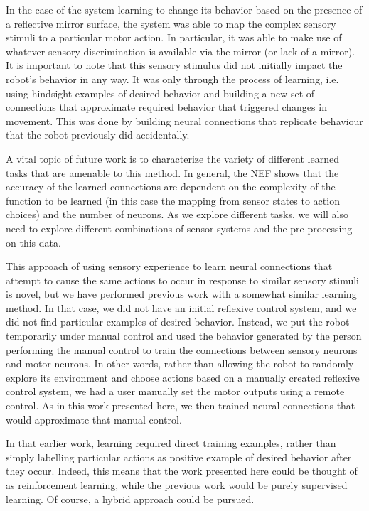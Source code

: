 \documentclass[conference]{IEEEtran}
\begin{document}
In the case of the system learning to change its behavior based on the 
presence of a reflective mirror surface, the system was able to map the 
complex sensory stimuli to a particular motor action.  In particular, it
was able to make use of whatever sensory discrimination is available via
the mirror (or lack of a mirror).  It is important to note that this sensory 
stimulus did not initially impact the robot's behavior in any way. It was 
only through the process of learning, i.e. using hindsight examples of desired 
behavior and building a new set of connections that approximate required 
behavior that triggered changes in movement.  This was done by building neural
connections that replicate behaviour that the robot previously did accidentally.

A vital topic of future work is to characterize the variety of different
learned tasks that are amenable to this method.  In general, the NEF shows
that the accuracy of the learned connections are dependent on the complexity
of the function to be learned (in this case the mapping from sensor states to
action choices) and the number of neurons.  As we explore different tasks,
we will also need to explore different combinations of sensor systems and
the pre-processing on this data.  

This approach of using sensory experience to learn neural connections
that attempt to cause the same actions to occur in response to similar
sensory stimuli is novel, but we have performed previous work \cite{conradt2014trainable}
with a somewhat similar learning method. In that case, we did not have an 
initial reflexive control system, and we did not find particular examples of 
desired behavior. Instead, we put the robot temporarily under manual control 
and used the behavior generated by the person performing the manual control 
to train the connections between sensory neurons and motor neurons.  In other
words, rather than allowing the robot to randomly explore its environment and
choose actions based on a manually created reflexive control system, we had
a user manually set the motor outputs using a remote control.  As in this work
presented here, we then trained neural connections that would approximate that
manual control.  

In that earlier work, learning required direct training examples, rather than 
simply labelling particular actions as positive example of desired behavior 
after they occur.  Indeed, this means that the work presented here could be 
thought of as reinforcement learning, while the previous work would be purely 
supervised learning. Of course, a hybrid approach could be pursued. 
\end{document}
